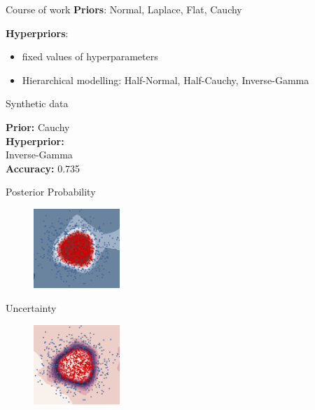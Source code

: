 \documentclass{beamer}
\begin{document}
\begin{frame}{Course of work}
	\textbf{Priors}: Normal, Laplace, Flat, Cauchy
	
	\textbf{Hyperpriors}:
	\begin{itemize}
		\item fixed values of hyperparameters
		\item Hierarchical modelling: Half-Normal, Half-Cauchy, Inverse-Gamma
	\end{itemize}
	
\end{frame}
\begin{frame}{Synthetic data}
	\begin{minipage}[t]{0.32\columnwidth}
	\vspace{0.7cm}
	\textbf{Prior:} Cauchy\\
	\textbf{Hyperprior:} \\Inverse-Gamma\\
	\textbf{Accuracy:} 0.735
	\end{minipage}
	\begin{minipage}[t]{0.32\columnwidth}
		\centering 
		Posterior Probability
		\begin{figure}
			\includegraphics[height=3cm]{pres_pics/circles_inv_cauchy_ppm.png}
		\end{figure}
	\end{minipage}
	\begin{minipage}[t]{0.32\columnwidth}
		\centering
		Uncertainty
		\begin{figure}
			\includegraphics[height=3cm]{pres_pics/circles_inv_cauchy_uncert.png}
		\end{figure}
	\end{minipage}


\end{frame}
\end{document}
